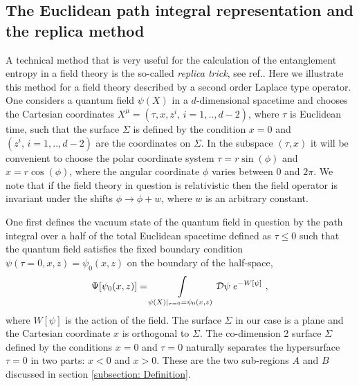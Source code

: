 \documentclass[12pt]{article}
\def\lb{\label}
\begin{document}
\subsection{The Euclidean path integral representation and the replica method}
\lb{subsection: replica method}
A technical method that is very useful for the calculation of the entanglement
entropy in a field theory is the so-called {\it replica trick}, see
ref.\cite{Callan:1994py}. Here we illustrate this method for a field theory described by a second order Laplace type operator.
 One considers a quantum field $\psi(X)$ in a
$d$-dimensional spacetime and  chooses the Cartesian coordinates
$X^\mu=(\tau,x, z^i,\, i=1,..,d{-}2)$, where $\tau$ is Euclidean time,
such that the surface $\Sigma$ is defined by the condition $x=0$ and
$(z^i,\, i=1,..,d{-}2)$ are the coordinates on $\Sigma$. In the
subspace $(\tau,x)$ it will be  convenient to choose the polar
coordinate system $\tau=r\sin(\phi)$ and $x=r\cos(\phi)$, where the
angular coordinate $\phi$ varies between $0$ and $2\pi$. We note that if the field theory in question is relativistic then the field operator is invariant under  the shifts
$\phi\rightarrow \phi +w$, where $w$ is an arbitrary constant.


One first defines the vacuum state of the quantum field in question
by the path integral over a half of the total Euclidean spacetime
defined as $\tau\leq 0$ such that the quantum field satisfies the
fixed boundary condition $\psi(\tau=0,x,z)=\psi_0(x,z)$ on the
boundary of the half-space,
 \begin{equation}
  \Psi[\psi_0(x,z)]=\int\limits_{\psi(X)|_{\tau=0}=\psi_0(x,z)}
   {\cal D}\psi\; e^{-W[\psi]}~,
  \lb{W1}
  \end{equation}
where $W[\psi]$ is the action
of the field. The surface $\Sigma$ in our case is a plane and the
Cartesian coordinate $x$ is orthogonal to $\Sigma$. 
The co-dimension 2 surface $\Sigma$ defined by the conditions $x=0$ and $\tau=0$ 
naturally separates   the hypersurface $\tau=0$ in two parts:
$x<0$ and $x>0$. These are the two sub-regions $A$ and $B$ discussed in section \ref{subsection: Definition}.
\end{document}
